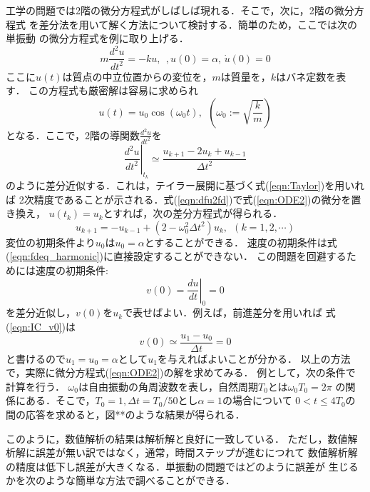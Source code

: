 \documentclass[10pt,a4j,dvipdfmx]{jarticle}
\begin{document}
工学の問題では2階の微分方程式がしばしば現れる．そこで，次に，2階の微分方程式
を差分法を用いて解く方法について検討する．簡単のため，ここでは次の単振動
の微分方程式を例に取り上げる．
\begin{equation}
	m\frac{d^2u }{dt^2}=-k u, \ \ , u(0)=\alpha,\, \dot u(0)=0
	\label{eqn:ODE2}
\end{equation}
ここに$u(t)$は質点の中立位置からの変位を，$m$は質量を，$k$はバネ定数を表す．
この方程式も厳密解は容易に求められ
\begin{equation}
	u(t)=u_0 \cos (\omega_0 t), \ \ \left( \omega_0:=\sqrt{\frac{k}{m}}\right)
	\label{eqn:exact}
\end{equation}
となる．ここで，2階の導関数$\frac{d^2u}{dt^2}$を
\begin{equation}
	\left. \frac{d^2u}{dt^2} \right|_{t_k} \simeq 
	\frac{u_{k+1}-2u_k +u_{k-1}}{\Delta t^2}
	\label{eqn:du2fd}
\end{equation}
のように差分近似する．これは，テイラー展開に基づく式(\ref{eqn:Taylor})を用いれば
2次精度であることが示される．式(\ref{eqn:dfu2fd})で式(\ref{eqn:ODE2})の微分を置き換え，
$u(t_k)=u_k$とすれば，次の差分方程式が得られる．
\begin{equation}
	u_{k+1}=-u_{k-1}+(2-\omega_0^2\Delta t^2)u_k, \ \ (k=1,2,\cdots)
	\label{eqn:fdeq_harmonic}
\end{equation}
変位の初期条件より$u_0$は$u_0=\alpha$とすることができる．
速度の初期条件は式(\ref{eqn:fdeq_harmonic})に直接設定することができない．
この問題を回避するためには速度の初期条件:
\begin{equation}
	v(0)= \left. \frac{du}{dt} \right|_{0}=0
	\label{eqn:IC_v0}
\end{equation}
を差分近似し，$v(0)$を$u_k$で表せばよい．例えば，前進差分を用いれば
式(\ref{eqn:IC_v0})は
\begin{equation}
	v(0)\simeq \frac{u_1-u_{0}}{\Delta t}=0
	\label{eqn:}
\end{equation}
と書けるので$u_1=u_0=\alpha$として$u_1$を与えればよいことが分かる．
以上の方法で，実際に微分方程式(\ref{eqn:ODE2})の解を求めてみる．
例として，次の条件で計算を行う．
$\omega_0$は自由振動の角周波数を表し，自然周期$T_0$とは$\omega_0T_0=2\pi$
の関係にある．そこで，$T_0=1, \Delta t=T_0/50$とし$\alpha=1$の場合について
$0<t\leq 4T_0$の間の応答を求めると，図**のような結果が得られる．


このように，数値解析の結果は解析解と良好に一致している．
ただし，数値解析解に誤差が無い訳ではなく，通常，時間ステップが進むにつれて
数値解析解の精度は低下し誤差が大きくなる．単振動の問題ではどのように誤差が
生じるかを次のような簡単な方法で調べることができる．
\end{document}
